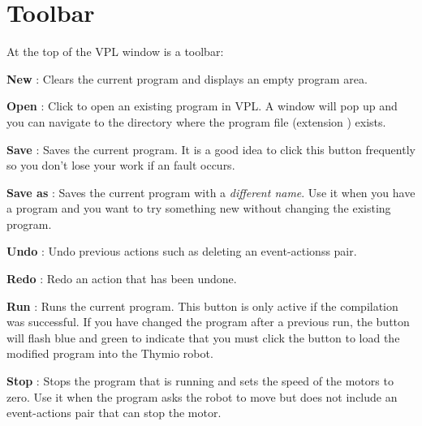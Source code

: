 
\label{a.toolbar}

\section*{Toolbar}

At the top of the VPL window is a toolbar:

\begin{center}
\end{center}

\bigskip
\bigskip

\textbf{New} : Clears the current program and displays an
empty program area.

\bigskip

\textbf{Open} : Click to open an existing program in VPL. A
window will pop up and you can navigate to the directory where the
program file (extension ) exists.

\bigskip

\textbf{Save} : Saves the current program. It is a good idea
to click this button frequently so you don't lose your work if an fault
occurs.

\bigskip

\textbf{Save as} : Saves the current program with a
\emph{different name}. Use it when you have a program and you want to
try something new without changing the existing program.

\bigskip

\textbf{Undo} : Undo previous actions such as deleting
an event-actionss pair.\label{p.undo}

\bigskip

\textbf{Redo} : Redo an action that has been undone.

\bigskip

\textbf{Run} : Runs the current program. This button is only
active if the compilation was successful. If you have changed the
program after a previous run, the button will flash blue and green to
indicate that you must click the button to load the modified program
into the Thymio robot.

\bigskip

\textbf{Stop} : Stops the program that is running and sets
the speed of the motors to zero. Use it when the program asks the robot
to move but does not include an event-actions pair that can stop the
motor.


